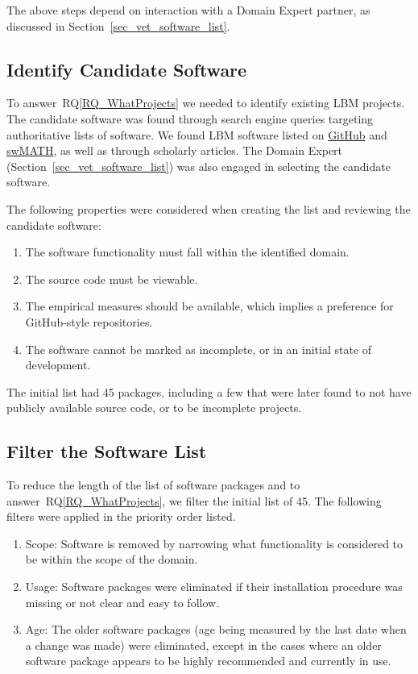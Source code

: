 \documentclass[final, 3p, times, authoryear]{elsarticle}
\newcommand{\rqref}[1]{RQ\ref{#1}}
\begin{document}
\noindent The above steps depend on interaction with a Domain Expert partner, as
discussed in Section~\ref{sec_vet_software_list}.

\subsection{Identify Candidate Software} \label{identifysoftware}

To answer~\rqref{RQ_WhatProjects} we needed to identify existing LBM projects.
The candidate software was found through search engine queries targeting
authoritative lists of software. We found LBM software listed on
\href{https://github.com/} {GitHub} and \href{https://swmath.org/} {swMATH}, as
well as through scholarly articles. The Domain Expert
(Section~\ref{sec_vet_software_list}) was also engaged in selecting the
candidate software.

The following properties were considered when creating the list and reviewing
the candidate software:

\begin{enumerate}
	\item The software functionality must fall within the identified domain.
	\item The source code must be viewable.
	\item The empirical measures should be available, which implies a preference
	for GitHub-style repositories.
	\item The software cannot be marked as incomplete, or in an initial state of
	development.
\end{enumerate}

The initial list had 45 packages, including a few that were later found to not
have publicly available source code, or to be incomplete projects.

\subsection{Filter the Software List} \label{filtersoftware}

To reduce the length of the list of software packages and to
answer~\rqref{RQ_WhatProjects}, we filter the initial list of 45.  The following
filters were applied in the priority order listed.

\begin{enumerate}
	\item Scope: Software is removed by narrowing what functionality is
	considered to be within the scope of the domain.
	\item Usage: Software packages were eliminated if their installation
	procedure was missing or not clear and easy to follow.
	\item Age: The older software packages (age being measured by the last date
	when a change was made) were eliminated, except in the cases where an older
	software package appears to be highly recommended and currently in use. 
\end{enumerate}
\end{document}
